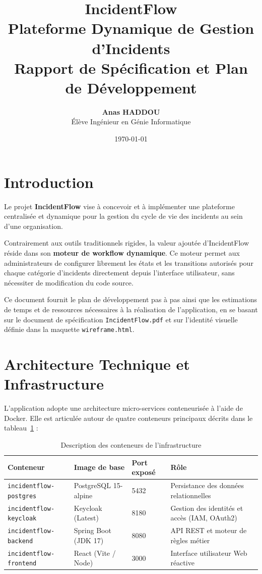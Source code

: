 \documentclass[12pt,a4paper]{article}
\title{
    \vspace{2cm}
    \textbf{\Huge IncidentFlow}\\[0.5cm]
    \Large Plateforme Dynamique de Gestion d'Incidents\\[1.5cm]
    \textbf{\Large Rapport de Spécification et Plan de Développement}
    \vspace{1.5cm}
}
\author{\textbf{Anas HADDOU} \\ Élève Ingénieur en Génie Informatique}
\date{\today}
\begin{document}
\maketitle
\thispagestyle{empty}
\clearpage

\tableofcontents
\clearpage

\section{Introduction}
Le projet \textbf{IncidentFlow} vise à concevoir et à implémenter une plateforme centralisée et dynamique pour la gestion du cycle de vie des incidents au sein d'une organisation. 

Contrairement aux outils traditionnels rigides, la valeur ajoutée d'IncidentFlow réside dans son \textbf{moteur de workflow dynamique}. Ce moteur permet aux administrateurs de configurer librement les états et les transitions autorisés pour chaque catégorie d'incidents directement depuis l'interface utilisateur, sans nécessiter de modification du code source.

Ce document fournit le plan de développement pas à pas ainsi que les estimations de temps et de ressources nécessaires à la réalisation de l'application, en se basant sur le document de spécification \texttt{IncidentFlow.pdf} et sur l'identité visuelle définie dans la maquette \texttt{wireframe.html}.

\section{Architecture Technique et Infrastructure}
L'application adopte une architecture micro-services conteneurisée à l'aide de Docker. Elle est articulée autour de quatre conteneurs principaux décrits dans le tableau~\ref{tab:architecture} :

\begin{table}[htbp]
    \centering
    \caption{Description des conteneurs de l'infrastructure}
    \label{tab:architecture}
    \vspace{0.3cm}
    \begin{tabular}{llll}
        \toprule
        \textbf{Conteneur} & \textbf{Image de base} & \textbf{Port exposé} & \textbf{Rôle} \\
        \midrule
        \texttt{incidentflow-postgres} & PostgreSQL 15-alpine & 5432 & Persistance des données relationnelles \\
        \texttt{incidentflow-keycloak} & Keycloak (Latest) & 8180 & Gestion des identités et accès (IAM, OAuth2) \\
        \texttt{incidentflow-backend} & Spring Boot (JDK 17) & 8080 & API REST et moteur de règles métier \\
        \texttt{incidentflow-frontend} & React (Vite / Node) & 3000 & Interface utilisateur Web réactive \\
        \bottomrule
    \end{tabular}
\end{table}
\end{document}
